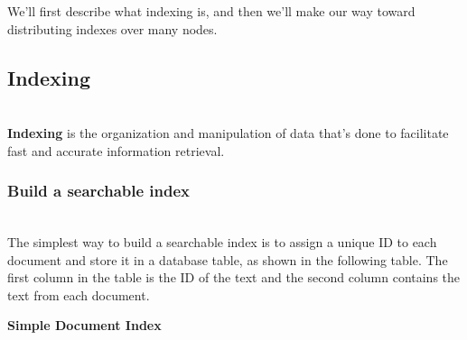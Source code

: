 

We'll first describe what indexing is, and then we'll make our way toward distributing indexes over many nodes.\\

\subsection{Indexing}\label{dkjyr_wdUR88EZ2MdpG2q}
\\
\textbf{Indexing} is the organization and manipulation of data that's done to facilitate fast and accurate information retrieval.

\subsubsection{Build a searchable index}\label{C0iN99pn8oBqZWtmTeZb3}
\\
The simplest way to build a searchable index is to assign a unique ID to each document and store it in a database table, as shown in the following table. The first column in the table is the ID of the text and the second column contains the text from each document.

\textbf{Simple Document Index}

\begin{table}[htbp]
\centering
\small
{}
\caption{Simple Document Index}
\end{table}

